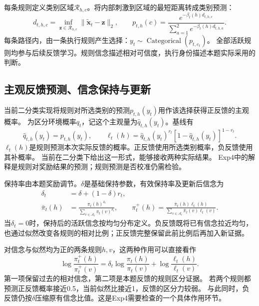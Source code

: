 \documentclass[11pt,a4paper]{article}
\numberwithin{equation}{section}
\newcommand{\A}{\mathcal A}
\newcommand{\Cat}{\operatorname{Categorical}}
\begin{document}
每条规则定义类别区域$\mathcal R_{h,c}$。将内部刺激到区域的最短距离转成类别预测：
\begin{equation}
d_{t,h,c}=\inf_{\bm z\in\mathcal R_{h,c}}\|\widetilde{\bm x}_t-\bm z\|_2,
\qquad
p_{t,h}(c)=\frac{e^{-\beta_t(h)d_{t,h,c}}}{\sum_{a=1}^2e^{-\beta_t(h)d_{t,h,a}}}.
\end{equation}
每条路径内，由一条执行规则产生选择：$y_t\sim\Cat(p_{t,e_t})$。
全部活跃规则均参与后续反馈学习。规则信念描述相对可信度，执行身份描述本题实际采用的判断。

\subsection{主观反馈预测、信念保持与更新}
当前二分类实现将规则对所选类别的预测$p_{t,h}(y_t)$用作该选择获得正反馈的主观概率。
为区分环境概率$q_t$，记这个主观量为$\widehat q_{t,h}(y_t)$。基线有
\begin{equation}
\widehat q_{t,h}(y_t)=p_{t,h}(y_t),\qquad
\ell_t(h)=\widehat q_{t,h}(y_t)^{r_t}
[1-\widehat q_{t,h}(y_t)]^{1-r_t}.
\label{eq:subjective-likelihood}
\end{equation}
$\ell_t(h)$是规则预测本次实际反馈的概率。正反馈使用所选类别概率，负反馈使用其补概率。
当前在二分类下给出这一形式，能够接收两种实际结果。
Exp4中的解释是规则对奖励结果的预测；规则预测是否校准仍需检验。

保持率由本题奖励调节。$\delta$是基础保持参数，有效保持率及更新后信念为
\begin{subequations}\label{eq:belief}
\begin{align}
\delta_t&=\delta+(1-\delta)r_t,\\
\bar\pi_t(h)&=\frac{\pi_t(h)^{\delta_t}}{\sum_{v\in\A_t}\pi_t(v)^{\delta_t}},\qquad
\pi_t^+(h)=\frac{\bar\pi_t(h)\ell_t(h)}{\sum_{v\in\A_t}\bar\pi_t(v)\ell_t(v)}.
\end{align}
\end{subequations}
当$\delta_t=0$时，保持后的活跃信念按均匀分布定义。负反馈既将已有信念拉近均匀，
也通过似然改变各规则的相对比例；正反馈完整保留此前比例后再加入新证据。

对信念与似然均为正的两条规则$h,v$，这两种作用可以直接看作
\begin{equation}
\log\frac{\pi_t^+(h)}{\pi_t^+(v)}
=\delta_t\log\frac{\pi_t(h)}{\pi_t(v)}+
\log\frac{\ell_t(h)}{\ell_t(v)}.
\label{eq:log-odds}
\end{equation}
第一项保留过去的相对信念，第二项是本题反馈的规则区分证据。
若两个规则都预测正反馈概率接近0.5，当前似然比接近1，反馈的区分力较弱。
与此同时，负反馈仍按$\delta$压缩原有信念比值。这是Exp4需要检查的一个具体作用环节。
\end{document}
